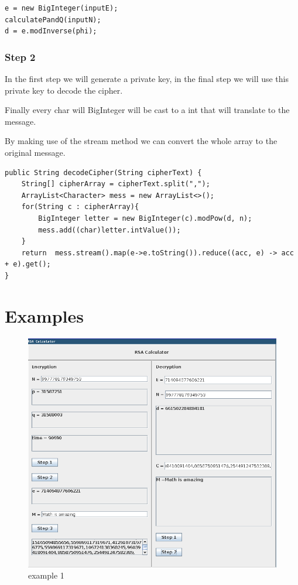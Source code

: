 \begin{lstlisting}
e = new BigInteger(inputE);
calculatePandQ(inputN);
d = e.modInverse(phi);
\end{lstlisting}{}

\subsubsection{Step 2}
In the first step we will generate a private key, in the final step we will use this private key to decode the cipher.

Finally every char will BigInteger will be cast to a int that will translate to the message.

By making use of the stream method we can convert the whole array to the original message.

\begin{lstlisting}
public String decodeCipher(String cipherText) {
    String[] cipherArray = cipherText.split(",");
    ArrayList<Character> mess = new ArrayList<>();
    for(String c : cipherArray){
        BigInteger letter = new BigInteger(c).modPow(d, n);
        mess.add((char)letter.intValue());
    }
    return  mess.stream().map(e->e.toString()).reduce((acc, e) -> acc  + e).get();
}
\end{lstlisting}
\newpage

\section{Examples}
\begin{figure}[h]
    \includegraphics[width=\linewidth]{images/example_1}
    \caption{example 1}
    \label{fig:boat1}
\end{figure}


